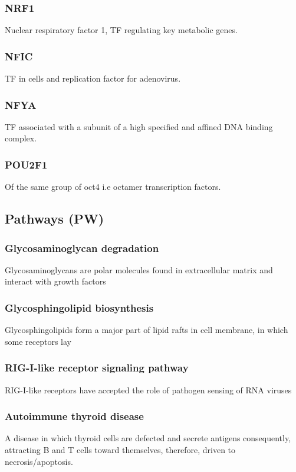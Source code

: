 \documentclass[3p,authoryear,preprint,12pt]{elsarticle}
\begin{document}
\subsubsection{NRF1}Nuclear respiratory factor 1, TF regulating key metabolic genes.

\subsubsection{NFIC}TF in cells and replication factor for adenovirus. 

\subsubsection{NFYA}TF associated with a subunit of a high specified and affined DNA binding complex.

\subsubsection{POU2F1}Of the same group of oct4 i.e octamer transcription factors.

\subsection{Pathways (PW)}

\subsubsection{Glycosaminoglycan degradation}
Glycosaminoglycans are polar molecules found in extracellular matrix and interact with growth factors%

\subsubsection{Glycosphingolipid biosynthesis}
Glycosphingolipids form a major part of lipid rafts in cell membrane, in which some receptors lay %

\subsubsection{RIG-I-like receptor signaling pathway}
RIG-I-like receptors have accepted the role of pathogen sensing of RNA viruses %

\subsubsection{Autoimmune thyroid disease}
A disease in which thyroid cells are defected and secrete antigens consequently, attracting B and T cells toward themselves, therefore, driven to necrosis/apoptosis. %
\end{document}
